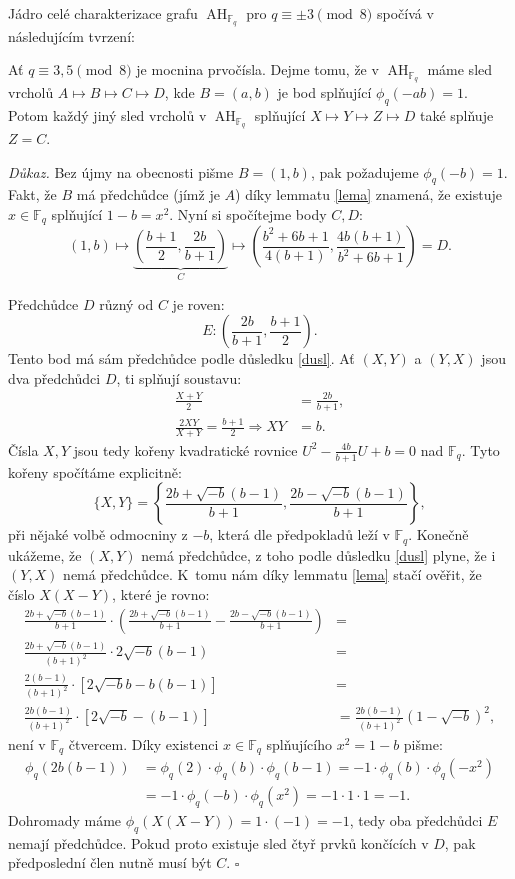 \documentclass[12pt]{report}
\DeclareMathOperator{\AH}{AH}
\begin{document}
Jádro celé charakterizace grafu $\AH_{\mathbb{F}_q}$ pro $q \equiv \pm 3 \pmod{8}$ spočívá v následujícím tvrzení:

\begin{lemma}\label{smol}
Ať $q \equiv 3,5 \pmod{8}$ je mocnina prvočísla. Dejme tomu, že v $\AH_{\mathbb{F}_q}$ máme sled vrcholů $A \longmapsto B \longmapsto C \longmapsto D$, kde $B = (a,b)$ je bod splňující $\phi_q(-ab) = 1$. Potom každý jiný sled vrcholů v $\AH_{\mathbb{F}_q}$ splňující $X \longmapsto Y \longmapsto Z \longmapsto D$ také splňuje $Z = C$.
\end{lemma}
\noindent \textit{Důkaz.} Bez újmy na obecnosti pišme $B = (1,b)$, pak požadujeme $\phi_q(-b)=1$. Fakt, že $B$ má předchůdce (jímž je $A$) díky lemmatu \ref{lema} znamená, že existuje $x \in \mathbb{F}_q$ splňující $1-b = x^2$. Nyní si spočítejme body $C,D$:
$$ (1,b) \longmapsto \underbrace{\left(\frac{b+1}{2}, \frac{2b}{b+1} \right)}_{C} \longmapsto \left( \frac{b^2+6b+1}{4(b+1)}, \frac{4b(b+1)}{b^2+6b+1} \right) = D. $$

Předchůdce $D$ různý od $C$ je roven:
$$E : \left(\frac{2b}{b+1}, \frac{b+1}{2} \right).$$
Tento bod má sám předchůdce podle důsledku \ref{dusl}. Ať $(X,Y)$ a $(Y,X)$ jsou dva předchůdci $D$, ti splňují soustavu:
\begin{align*}
\frac{X+Y}{2} &= \frac{2b}{b+1},\\
\frac{2XY}{X+Y} =  \frac{b+1}{2} \Rightarrow XY &= b.
\end{align*}
Čísla $X,Y$ jsou tedy kořeny kvadratické rovnice $U^2 - \frac{4b}{b+1} U + b = 0$ nad $\mathbb{F}_q$. Tyto kořeny spočítáme explicitně:
$$\lbrace X,Y \rbrace = \left\lbrace \frac{2b + \sqrt{-b}(b-1)}{b+1},\frac{2b - \sqrt{-b}(b-1)}{b+1} \right\rbrace,$$
při nějaké volbě odmocniny z $-b$, která dle předpokladů leží v $\mathbb{F}_q$. Konečně ukážeme, že $(X,Y)$ nemá předchůdce, z toho podle důsledku \ref{dusl} plyne, že i $(Y,X)$ nemá předchůdce. K~tomu nám díky lemmatu \ref{lema} stačí ověřit, že číslo $X(X-Y)$, které je rovno:
\begin{align*}
\frac{2b + \sqrt{-b}(b-1)}{b+1} \cdot \left( \frac{2b + \sqrt{-b}(b-1)}{b+1} - \frac{2b - \sqrt{-b}(b-1)}{b+1} \right) &=\\
\frac{2b + \sqrt{-b}(b-1)}{(b+1)^2} \cdot 2 \sqrt{-b}(b-1)&=\\
\frac{2 (b-1)}{(b+1)^2} \cdot [2 \sqrt{-b} b - b(b-1)] &=\\
\frac{2 b(b-1)}{(b+1)^2} \cdot [2 \sqrt{-b}-(b-1)] &= \frac{2 b(b-1)}{(b+1)^2} (1-\sqrt{-b})^2,
\end{align*}
není v $\mathbb{F}_q$ čtvercem. Díky existenci $x \in \mathbb{F}_q$ splňujícího $x^2 = 1-b$ pišme:
\begin{align*}
\phi_q( 2 b (b-1)) &= \phi_q (2) \cdot \phi_q(b) \cdot \phi_q(b-1) = -1 \cdot \phi_q(b) \cdot \phi_q(-x^2)\\
&= -1 \cdot \phi_q (-b) \cdot \phi_q(x^2) = -1 \cdot 1 \cdot 1 = -1.
\end{align*}
Dohromady máme $\phi_q (X(X-Y)) = 1 \cdot (-1) = -1$, tedy oba předchůdci $E$ nemají předchůdce. Pokud proto existuje sled čtyř prvků končících v $D$, pak předposlední člen nutně musí být $C$. \hfill $\square$
\end{document}
